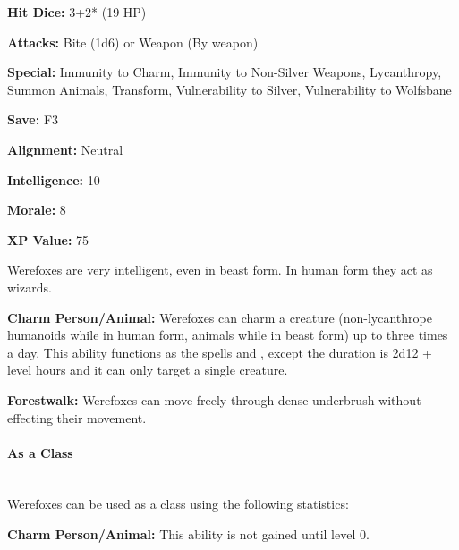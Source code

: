\begin{multicols*}{2}
{\textbf{Hit Dice:} 3+2* (19 HP)

\textbf{Attacks:} Bite (1d6) or Weapon (By weapon)

\textbf{Special:} Immunity to Charm, Immunity to Non-Silver Weapons, Lycanthropy, Summon Animals, Transform, Vulnerability to Silver, Vulnerability to Wolfsbane

\textbf{Save:} F3

\textbf{Alignment:} Neutral

\textbf{Intelligence:} 10

\textbf{Morale:} 8

\textbf{XP Value:} 75}

Werefoxes are very intelligent, even in beast form. In human form they act as wizards.

\textbf{Charm Person/Animal:} Werefoxes can charm a creature (non-lycanthrope humanoids while in human form, animals while in beast form) up to three times a day. This ability functions as the spells  and , except the duration is 2d12 + level hours and it can only target a single creature.

\textbf{Forestwalk:} Werefoxes can move freely through dense underbrush without effecting their movement.

\paragraph{As a Class}\mbox{}\\
Werefoxes can be used as a class using the following statistics:

\textbf{Charm Person/Animal:} This ability is not gained until level 0.



\end{multicols*}
